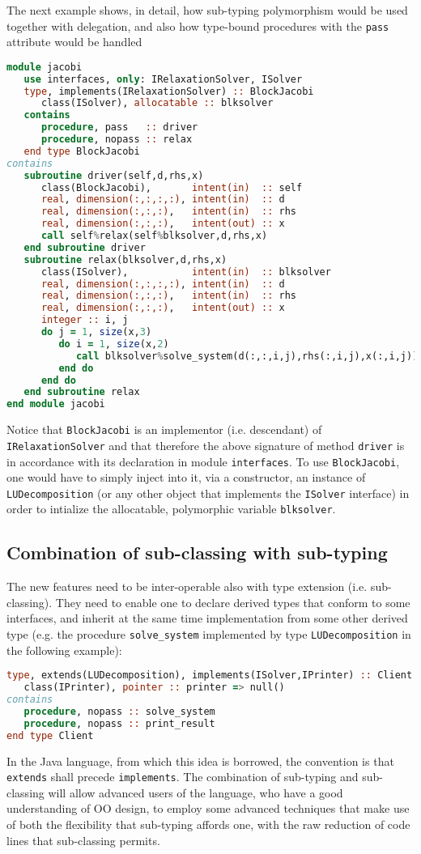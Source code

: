 \documentclass[11pt,oneside]{article}
\begin{document}
The next example shows, in detail, how sub-typing polymorphism would
be used together with delegation, and also how type-bound procedures
with the \texttt{pass} attribute would be handled
\begin{lstlisting}[language=Fortran]
module jacobi
   use interfaces, only: IRelaxationSolver, ISolver
   type, implements(IRelaxationSolver) :: BlockJacobi
      class(ISolver), allocatable :: blksolver
   contains
      procedure, pass   :: driver
      procedure, nopass :: relax
   end type BlockJacobi
contains
   subroutine driver(self,d,rhs,x)
      class(BlockJacobi),       intent(in)  :: self
      real, dimension(:,:,:,:), intent(in)  :: d
      real, dimension(:,:,:),   intent(in)  :: rhs
      real, dimension(:,:,:),   intent(out) :: x
      call self%relax(self%blksolver,d,rhs,x)
   end subroutine driver
   subroutine relax(blksolver,d,rhs,x)
      class(ISolver),           intent(in)  :: blksolver
      real, dimension(:,:,:,:), intent(in)  :: d
      real, dimension(:,:,:),   intent(in)  :: rhs
      real, dimension(:,:,:),   intent(out) :: x
      integer :: i, j
      do j = 1, size(x,3)
         do i = 1, size(x,2)
            call blksolver%solve_system(d(:,:,i,j),rhs(:,i,j),x(:,i,j))
         end do
      end do
   end subroutine relax
end module jacobi
\end{lstlisting}
Notice that \texttt{BlockJacobi} is an implementor (i.e. descendant)
of \texttt{IRelaxationSolver} and that therefore the above signature
of method \texttt{driver} is in accordance with its declaration in
module \texttt{interfaces}. To use \texttt{BlockJacobi}, one would
have to simply inject into it, via a constructor, an instance of
\texttt{LUDecomposition} (or any other object that implements the
\texttt{ISolver} interface) in order to intialize the allocatable,
polymorphic variable \texttt{blksolver}.

\subsection{Combination of sub-classing with sub-typing}

The new features need to be inter-operable also with type extension
(i.e. sub-classing). They need to enable one to declare derived types
that conform to some interfaces, and inherit at the same time
implementation from some other derived type (e.g. the procedure
\texttt{solve\_system} implemented by type \texttt{LUDecomposition} in
the following example):
\begin{lstlisting}[language=Fortran]
type, extends(LUDecomposition), implements(ISolver,IPrinter) :: Client
   class(IPrinter), pointer :: printer => null()
contains
   procedure, nopass :: solve_system
   procedure, nopass :: print_result
end type Client
\end{lstlisting}
In the Java language, from which this idea is borrowed, the convention
is that \texttt{extends} shall precede \texttt{implements}. The
combination of sub-typing and sub-classing will allow advanced users
of the language, who have a good understanding of OO design, to employ
some advanced techniques that make use of both the flexibility that
sub-typing affords one, with the raw reduction of code lines that
sub-classing permits.
\end{document}
